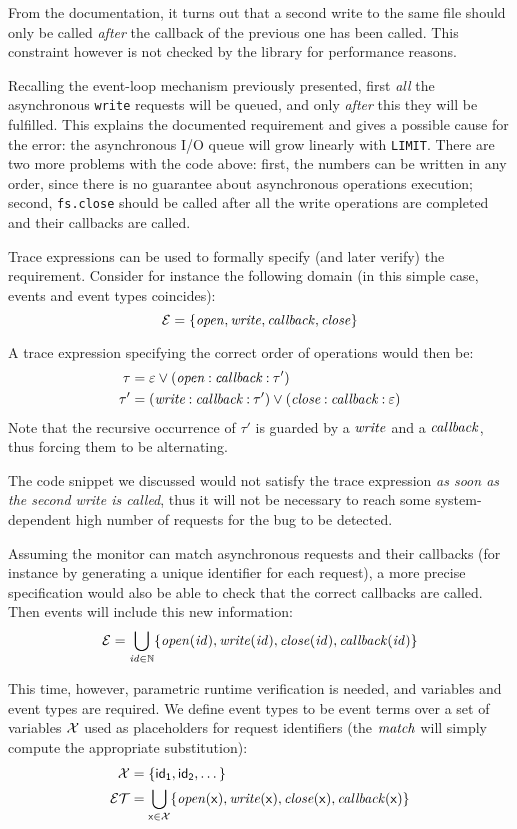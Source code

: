 From the documentation, it turns out that a second write to the same file should only be called \emph{after} the callback of the previous one has been called.
This constraint however is not checked by the library for performance reasons.

Recalling the event-loop mechanism previously presented, first \emph{all} the asynchronous \lstinline{write} requests will be queued, and only \emph{after} this they will be fulfilled.
This explains the documented requirement and gives a possible cause for the error: the asynchronous I/O queue will grow linearly with \lstinline{LIMIT}.
There are two more problems with the code above: first, the numbers can be written in any order, since there is no guarantee about asynchronous operations execution; second, \lstinline{fs.close} should be called after all the write operations are completed and their callbacks are called.

Trace expressions can be used to formally specify (and later verify) the requirement.
Consider for instance the following domain (in this simple case, events and event types coincides):
\[ \mathcal{E} = \{ \mathit{open}, \mathit{write}, \mathit{callback}, \mathit{close} \} \]

A trace expression specifying the correct order of operations would then be:
\begin{align*}
\tau &= \varepsilon \mathbin{\vee} (\mathit{open} \mathbin{:} \mathit{callback} \mathbin{:} \tau')\\
\tau' &= (\mathit{write} \mathbin{:} \mathit{callback} \mathbin{:} \tau') \mathbin{\vee} (\mathit{close} \mathbin{:} \mathit{callback} \mathbin{:} \varepsilon)
\end{align*}
Note that the recursive occurrence of \(\tau'\) is guarded by a \(\mathit{write}\) and a \(\mathit{callback}\), thus forcing them to be alternating.

The code snippet we discussed would not satisfy the trace expression \emph{as soon as the second write is called}, thus it will not be necessary to reach some system-dependent high number of requests for the bug to be detected.

Assuming the monitor can match asynchronous requests and their callbacks (for instance by generating a unique identifier for each request), a more precise specification would also be able to check that the correct callbacks are called.
Then events will include this new information:
\[ \mathcal{E} = \bigcup_{\mathit{id} \in \mathbb{N}} \{\mathit{open}(\mathit{id}), \mathit{write}(\mathit{id}), \mathit{close}(\mathit{id}), \mathit{callback}(\mathit{id}) \} \]

This time, however, parametric runtime verification is needed, and variables and event types are required.
We define event types to be event terms over a set of variables \(\mathcal{X}\) used as placeholders for request identifiers (the \(\mathit{match}\) will simply compute the appropriate substitution):
\begin{align*}
\mathcal{X} &= \{ \mathsf{id_1}, \mathsf{id_2}, \dotsc \}\\
\mathcal{ET} &= \bigcup_{\mathsf{x} \in \mathcal{X}} \{\mathit{open}(\mathsf{x}), \mathit{write}(\mathsf{x}), \mathit{close}(\mathsf{x}), \mathit{callback}(\mathsf{x}) \}
\end{align*}

